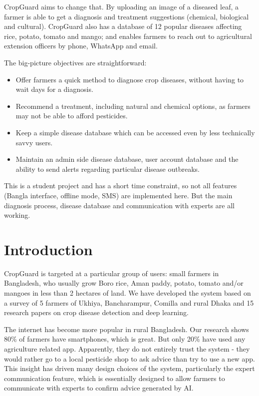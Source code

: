 \documentclass[12pt,a4paper]{article}
\begin{document}
CropGuard aims to change that. By uploading an image of a diseased leaf, a farmer is able to get a diagnosis and treatment suggestions (chemical, biological and cultural). CropGuard also has a database of 12 popular diseases affecting rice, potato, tomato and mango; and enables farmers to reach out to agricultural extension officers by phone, WhatsApp and email.

The big-picture objectives are straightforward:

\begin{itemize}[leftmargin=2em]
  \item Offer farmers a quick method to diagnose crop diseases, without having to wait days for a diagnosis.
  \item Recommend a treatment, including natural and chemical options, as farmers may not be able to afford pesticides.
  \item Keep a simple disease database which can be accessed even by less technically savvy users.
  \item Maintain an admin side disease database, user account database and the ability to send alerts regarding particular disease outbreaks.
\end{itemize}

This is a student project and has a short time constraint, so not all features (Bangla interface, offline mode, SMS) are implemented here. But the main diagnosis process, disease database and communication with experts are all working.

\section{Introduction}

CropGuard is targeted at a particular group of users: small farmers in Bangladesh, who usually grow Boro rice, Aman paddy, potato, tomato and/or mangoes in less than 2 hectares of land. We have developed the system based on a survey of 5 farmers of Ukhiya, Bancharampur, Comilla and rural Dhaka and 15 research papers on crop disease detection and deep learning.

The internet has become more popular in rural Bangladesh. Our research shows 80\% of farmers have smartphones, which is great. But only 20\% have used any agriculture related app. Apparently, they do not entirely trust the system - they would rather go to a local pesticide shop to ask advice than try to use a new app. This insight has driven many design choices of the system, particularly the expert communication feature, which is essentially designed to allow farmers to communicate with experts to confirm advice generated by AI.
\end{document}
